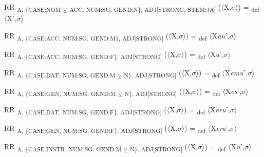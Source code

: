 {\begin{exe}
 RR \textsubscript{A, \{CASE:NOM} \textsubscript{${\veebar}$} \textsubscript{ACC, NUM:SG, GEND:N\}, ADJ[STRONG, STEM:JA]} ($\langle$X,$\sigma $$\rangle$) = \textsubscript{def} $\langle$Xˊ,$\sigma $$\rangle$
\end{exe}

\begin{exe}
 RR \textsubscript{A, \{CASE:ACC, NUM:SG, GEND:M\}, ADJ[STRONG]} ($\langle$X,$\sigma $$\rangle$) = \textsubscript{def} $\langle$X\textit{an}ˊ,$\sigma $$\rangle$
\end{exe}

\begin{exe}
 RR \textsubscript{A, \{CASE:ACC, NUM:SG, GEND:F\}, ADJ[STRONG]} ($\langle$X,$\sigma $$\rangle$) = \textsubscript{def} $\langle$X\textit{a}ˊ,$\sigma $$\rangle$
\end{exe}

\begin{exe}
 RR \textsubscript{A, \{CASE:DAT, NUM:SG, GEND:M} \textsubscript{${\veebar}$} \textsubscript{N\}, ADJ[STRONG]} ($\langle$X,$\sigma $$\rangle$) = \textsubscript{def} $\langle$X\textit{emu}ˊ,$\sigma $$\rangle$
\end{exe}

\begin{exe}
 RR \textsubscript{A, \{CASE:GEN, NUM:SG, GEND:M} \textsubscript{${\veebar}$} \textsubscript{N\}, ADJ[STRONG]} ($\langle$X,$\sigma $$\rangle$) = \textsubscript{def} $\langle$X\textit{es}ˊ,$\sigma $$\rangle$
\end{exe}

\begin{exe}
 RR \textsubscript{A, \{CASE:DAT, NUM:SG, GEND:F\}, ADJ[STRONG]} ($\langle$X,$\sigma $$\rangle$) = \textsubscript{def} $\langle$X\textit{eru}ˊ,$\sigma $$\rangle$
\end{exe}

\begin{exe}
 RR \textsubscript{A, \{CASE:GEN, NUM:SG, GEND:F\}, ADJ[STRONG]} ($\langle$X,$\sigma $$\rangle$) = \textsubscript{def} $\langle$X\textit{era}ˊ,$\sigma $$\rangle$
\end{exe}

\begin{exe}
 RR \textsubscript{A, \{CASE:INSTR, NUM:SG, GEND:M} \textsubscript{${\veebar}$} \textsubscript{N\}, ADJ[STRONG]} ($\langle$X,$\sigma $$\rangle$) = \textsubscript{def} $\langle$X\textit{u}ˊ,$\sigma $$\rangle$
\end{exe}

}
